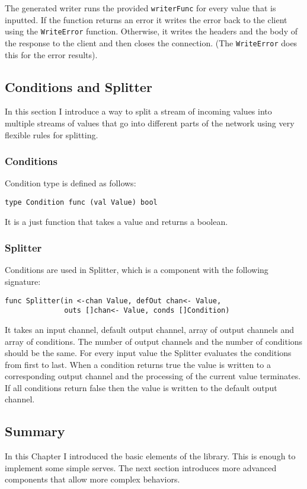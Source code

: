 \documentclass[12pt,a4paper]{article}
\begin{document}
The generated writer runs the provided \texttt{writerFunc} for every value 
that is inputted. If the function returns an error it writes the error 
back to the client using the \texttt{WriteError} function. Otherwise, it 
writes the headers and the body of the response to the client and then 
closes the connection. (The \texttt{WriteError} does this for the error
results).

\subsection{Conditions and Splitter}
In this section I introduce a way to split a stream of incoming values into
multiple streams of values that go into different parts of the network
using very flexible rules for splitting.

\subsubsection{Conditions}
Condition type is defined as follows:
\begin{lstlisting}
type Condition func (val Value) bool
\end{lstlisting}
It is a just function that takes a value and returns a boolean.

\subsubsection{Splitter}
Conditions are used in Splitter, which is a component with the 
following signature:
\begin{lstlisting}
func Splitter(in <-chan Value, defOut chan<- Value, 
			  outs []chan<- Value, conds []Condition)
\end{lstlisting}
It takes an input channel, default output channel, array of output channels and array of conditions.
The number of output channels and the number of conditions should be the same.
For every input value the Splitter evaluates the conditions from first to last.
When a condition returns true the value is written to a corresponding output channel 
and the processing of the current value terminates. If all conditions return false
then the value is written to the default output channel.

\subsection{Summary}
In this Chapter I introduced the basic elements of the library. This 
is enough to implement some simple serves. The next section introduces
more advanced components that allow more complex behaviors.
\end{document}
